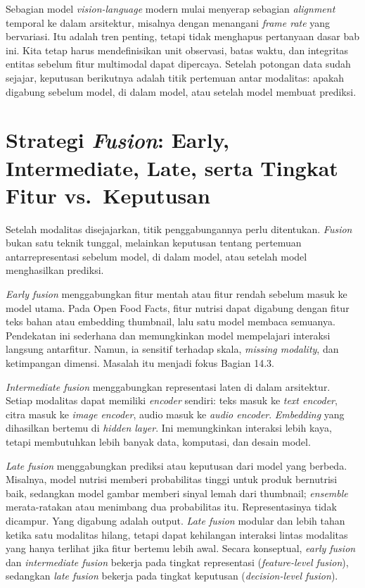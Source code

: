 Sebagian model \emph{vision-language} modern mulai menyerap sebagian \emph{alignment} temporal ke dalam arsitektur, misalnya dengan menangani \emph{frame rate} yang bervariasi. Itu adalah tren penting, tetapi tidak menghapus pertanyaan dasar bab ini. Kita tetap harus mendefinisikan unit observasi, batas waktu, dan integritas entitas sebelum fitur multimodal dapat dipercaya. Setelah potongan data sudah sejajar, keputusan berikutnya adalah titik pertemuan antar modalitas: apakah digabung sebelum model, di dalam model, atau setelah model membuat prediksi.

\section{\texorpdfstring{Strategi \emph{Fusion}: Early, Intermediate, Late, serta Tingkat Fitur vs.~Keputusan}{Strategi Fusion: Early, Intermediate, Late, serta Tingkat Fitur vs.~Keputusan}}\label{strategi-fusion-early-intermediate-late-serta-tingkat-fitur-vs.-keputusan}

Setelah modalitas disejajarkan, titik penggabungannya perlu ditentukan. \emph{Fusion} bukan satu teknik tunggal, melainkan keputusan tentang pertemuan antarrepresentasi sebelum model, di dalam model, atau setelah model menghasilkan prediksi.

\emph{Early fusion} menggabungkan fitur mentah atau fitur rendah sebelum masuk ke model utama. Pada Open Food Facts, fitur nutrisi dapat digabung dengan fitur teks bahan atau embedding thumbnail, lalu satu model membaca semuanya. Pendekatan ini sederhana dan memungkinkan model mempelajari interaksi langsung antarfitur. Namun, ia sensitif terhadap skala, \emph{missing modality}, dan ketimpangan dimensi. Masalah itu menjadi fokus Bagian 14.3.

\emph{Intermediate fusion} menggabungkan representasi laten di dalam arsitektur. Setiap modalitas dapat memiliki \emph{encoder} sendiri: teks masuk ke \emph{text encoder}, citra masuk ke \emph{image encoder}, audio masuk ke \emph{audio encoder}. \emph{Embedding} yang dihasilkan bertemu di \emph{hidden layer}. Ini memungkinkan interaksi lebih kaya, tetapi membutuhkan lebih banyak data, komputasi, dan desain model.

\emph{Late fusion} menggabungkan prediksi atau keputusan dari model yang berbeda. Misalnya, model nutrisi memberi probabilitas tinggi untuk produk bernutrisi baik, sedangkan model gambar memberi sinyal lemah dari thumbnail; \emph{ensemble} merata-ratakan atau menimbang dua probabilitas itu. Representasinya tidak dicampur. Yang digabung adalah output. \emph{Late fusion} modular dan lebih tahan ketika satu modalitas hilang, tetapi dapat kehilangan interaksi lintas modalitas yang hanya terlihat jika fitur bertemu lebih awal. Secara konseptual, \emph{early fusion} dan \emph{intermediate fusion} bekerja pada tingkat representasi (\emph{feature-level fusion}), sedangkan \emph{late fusion} bekerja pada tingkat keputusan (\emph{decision-level fusion}).

